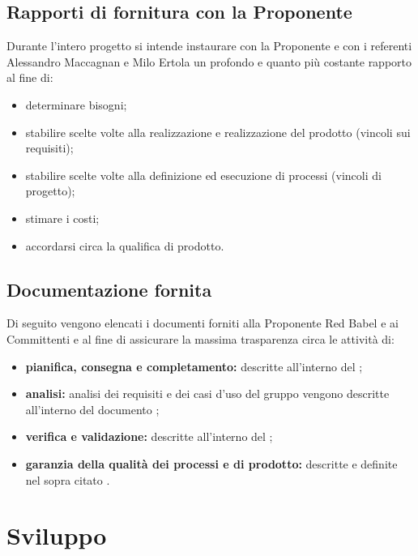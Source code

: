 \documentclass[NormeDiProgetto.tex]{subfiles}
\begin{document}
\subsection[Rapporti di fornitura con la Proponente \Proponente]{Rapporti di fornitura con la Proponente \\ \Proponente}
Durante l'intero progetto si intende instaurare con la Proponente \Proponente{} e con i referenti Alessandro Maccagnan e Milo Ertola un profondo e quanto più costante rapporto al fine di:
\begin{itemize}
	\item determinare bisogni;
	\item stabilire scelte volte alla realizzazione e realizzazione del prodotto (vincoli sui requisiti);
	\item stabilire scelte volte alla definizione ed esecuzione di processi (vincoli di progetto);
	\item stimare i costi;
	\item accordarsi circa la qualifica di prodotto.
\end{itemize}
\subsection{Documentazione fornita}
Di seguito vengono elencati i documenti forniti alla Proponente Red Babel e ai Committenti \Vardanega e \Cardin al fine di assicurare la massima trasparenza circa le attività di:
\begin{itemize}
	\item \textbf{pianifica, consegna e completamento:} descritte all'interno del \pdp \vruno;
	\item \textbf{analisi:} analisi dei requisiti e dei casi d'uso del gruppo vengono descritte all'interno del documento \adr \vruno;
	\item \textbf{verifica e validazione:} descritte all'interno del \pdq \vruno;
	\item \textbf{garanzia della qualità dei processi e di prodotto:} descritte e definite nel sopra citato \pdq \vruno.
\end{itemize}
\section{Sviluppo}
\end{document}
